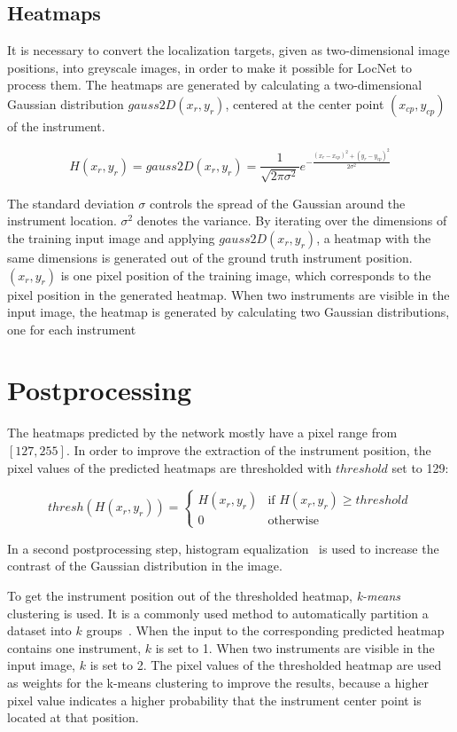 \documentclass[conference]{IEEEtran}
\begin{document}
\subsection{Heatmaps}
It is necessary to convert the localization targets, given as two-dimensional image positions,
into greyscale images, in order to make it possible for LocNet to process them. The heatmaps are generated by calculating a two-dimensional Gaussian distribution
$gauss2D(x_r,y_r)$, centered at the center point $(x_{cp}, y_{cp})$ of the instrument.

\begin{equation}
\label{eq:gauss2D_function}
H(x_r,y_r)=gauss2D(x_r,y_r) = \frac{1}{\sqrt{2\pi\sigma^2} } e^{ -\frac{(x_r-x_{cp})^2 + (y_r-y_{cp})^2}{2\sigma^2} }
\end{equation}

The standard deviation $\sigma$ controls the spread of the Gaussian around the instrument
location. $\sigma^2$ denotes the variance.
By iterating over the dimensions of the training input image and applying $gauss2D(x_r,y_r)$, a heatmap with the same dimensions is generated out of the ground truth instrument position.
$(x_r, y_r)$ is one pixel position of the training image, which corresponds to the pixel position in the generated heatmap.
When two instruments are visible in the input image, the heatmap is generated by calculating two Gaussian distributions, one for each instrument %


\section{Postprocessing}
The heatmaps predicted by the network mostly have a pixel range from $[127,255]$.
In order to improve the extraction of the instrument position, the pixel values of the predicted heatmaps are thresholded with $threshold$ set to 129:

\[
    thresh(H(x_r,y_r))= 
\begin{cases}
    H(x_r,y_r)& \text{if } H(x_r,y_r)\geq threshold\\
    0         & \text{otherwise}
\end{cases}
\]

In a second postprocessing step, histogram equalization~\cite{equalization_histogram1987pizer} is used to increase the contrast of the Gaussian distribution in the image.

To get the instrument position out of the thresholded heatmap, \emph{k-means} clustering is used. It is a commonly used method to automatically partition a dataset into $k$ groups~\cite{k-means-paper2005sipkins}.
When the input to the corresponding predicted heatmap contains one instrument, $k$ is set to 1. When two instruments are visible in the input image, $k$ is set to 2.
The pixel values of the thresholded heatmap are used as weights for the k-means clustering to improve the results, because a higher pixel value indicates a higher probability that the instrument center point is located at that position.
\end{document}
